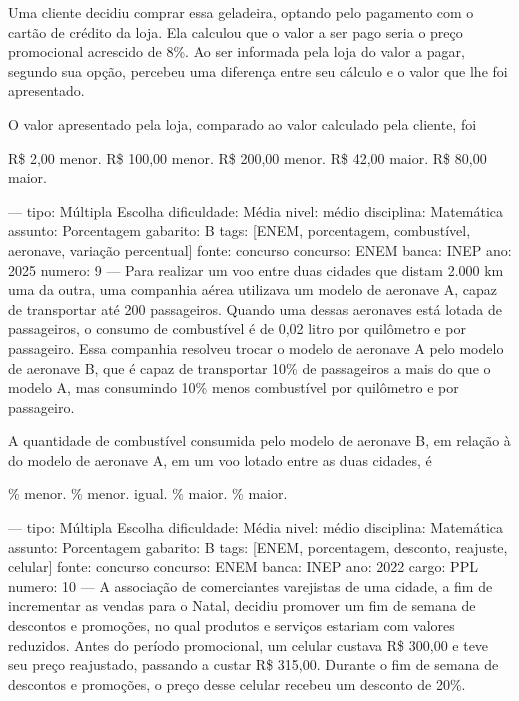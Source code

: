 Uma cliente decidiu comprar essa geladeira, optando pelo pagamento com o cartão de crédito da loja. Ela calculou que o valor a ser pago seria o preço promocional acrescido de 8\%. Ao ser informada pela loja do valor a pagar, segundo sua opção, percebeu uma diferença entre seu cálculo e o valor que lhe foi apresentado.

O valor apresentado pela loja, comparado ao valor calculado pela cliente, foi
\begin{choices}
\CorrectChoice R\$ 2,00 menor.
\choice R\$ 100,00 menor.
\choice R\$ 200,00 menor.
\choice R\$ 42,00 maior.
\choice R\$ 80,00 maior.
\end{choices}

---
tipo: Múltipla Escolha
dificuldade: Média
nivel: médio
disciplina: Matemática
assunto: Porcentagem
gabarito: B
tags: [ENEM, porcentagem, combustível, aeronave, variação percentual]
fonte: concurso
concurso: ENEM
banca: INEP
ano: 2025
numero: 9
---
\question
Para realizar um voo entre duas cidades que distam 2.000 km uma da outra, uma companhia aérea utilizava um modelo de aeronave A, capaz de transportar até 200 passageiros. Quando uma dessas aeronaves está lotada de passageiros, o consumo de combustível é de 0,02 litro por quilômetro e por passageiro. Essa companhia resolveu trocar o modelo de aeronave A pelo modelo de aeronave B, que é capaz de transportar 10\% de passageiros a mais do que o modelo A, mas consumindo 10\% menos combustível por quilômetro e por passageiro.

A quantidade de combustível consumida pelo modelo de aeronave B, em relação à do modelo de aeronave A, em um voo lotado entre as duas cidades, é
\begin{choices}
\% menor.
\% menor.
\choice igual.
\% maior.
\% maior.
\end{choices}

---
tipo: Múltipla Escolha
dificuldade: Média
nivel: médio
disciplina: Matemática
assunto: Porcentagem
gabarito: B
tags: [ENEM, porcentagem, desconto, reajuste, celular]
fonte: concurso
concurso: ENEM
banca: INEP
ano: 2022
cargo: PPL
numero: 10
---
\question
A associação de comerciantes varejistas de uma cidade, a fim de incrementar as vendas para o Natal, decidiu promover um fim de semana de descontos e promoções, no qual produtos e serviços estariam com valores reduzidos. Antes do período promocional, um celular custava R\$ 300,00 e teve seu preço reajustado, passando a custar R\$ 315,00. Durante o fim de semana de descontos e promoções, o preço desse celular recebeu um desconto de 20\%.

